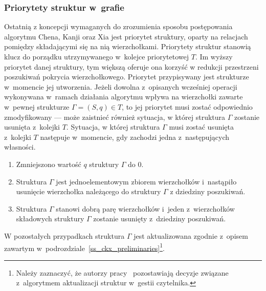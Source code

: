 \subsubsection{\textbf{Priorytety struktur w~grafie}}
\label{sss_ckx_priorities}
\par{
  Ostatnią z koncepcji wymaganych do zrozumienia sposobu postępowania algorytmu Chena, Kanji oraz Xia jest priorytet struktury, oparty na relacjach pomiędzy składającymi się na nią wierzchołkami.
  Priorytety struktur stanowią klucz do porządku utrzymywanego w~kolejce priorytetowej $T$.
  Im wyższy priorytet danej struktury, tym większą oferuje ona korzyść w redukcji przestrzeni poszukiwań pokrycia wierzchołkowego.
  Priorytet przypisywany jest strukturze w~momencie jej utworzenia.
  Jeżeli dowolna z~opisanych wcześniej operacji wykonywana w~ramach działania algorytmu wpływa na wierzchołki zawarte w~pewnej strukturze $\Gamma=(S, q) \in T$, to jej priorytet musi zostać odpowiednio zmodyfikowany --- może zaistnieć również sytuacja, w której struktura $\Gamma$ zostanie usunięta z~kolejki $T$.
  Sytuacja, w której struktura $\Gamma$ musi zostać usunięta z~kolejki $T$ następuje w~momencie, gdy zachodzi jedna z~następujących własności.
  \begin{enumerate}
    \item Zmniejszono wartość $q$ struktury $\Gamma$ do $0$.
    \item Struktura $\Gamma$ jest jednoelementowym zbiorem wierzchołków i~nastąpiło usunięcie wierzchołka należącego do struktury $\Gamma$ z dziedziny poszukiwań.
    \item Struktura $\Gamma$ stanowi dobrą parę wierzchołków i~jeden z~wierzchołków składowych struktury $\Gamma$ zostanie usunięty z~dziedziny poszukiwań.
  \end{enumerate}
  
  W pozostałych przypadkach struktura $\Gamma$ jest aktualizowana zgodnie z~opisem zawartym w~podrozdziale~\ref{ss_ckx_preliminaries}\footnote{Należy zaznaczyć, że autorzy pracy~\cite{ImprovedBounds10} pozostawiają decyzje związane z~algorytmem aktualizacji struktur w~gestii czytelnika.}.

}
